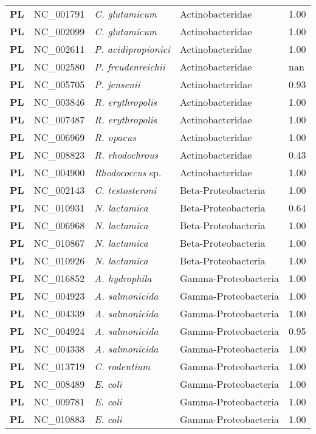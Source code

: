 \begin{adjustwidth}{-3cm}{2cm}
{\begin{supertabular}{>{\bfseries}l|p{0.1\textwidth}p{0.14\textwidth}l|l}
PL & NC\_001791 & \textit{C. glutamicum} & Actinobacteridae & 1.00\\
PL & NC\_002099 & \textit{C. glutamicum} & Actinobacteridae & 1.00\\
PL & NC\_002611 & \textit{P. acidipropionici} & Actinobacteridae & 1.00\\
PL & NC\_002580 & \textit{P. freudenreichii} & Actinobacteridae & nan\\
PL & NC\_005705 & \textit{P. jensenii} & Actinobacteridae & 0.93\\
PL & NC\_003846 & \textit{R. erythropolis} & Actinobacteridae & 1.00\\
PL & NC\_007487 & \textit{R. erythropolis} & Actinobacteridae & 1.00\\
PL & NC\_006969 & \textit{R. opacus} & Actinobacteridae & 1.00\\
PL & NC\_008823 & \textit{R. rhodochrous} & Actinobacteridae & 0.43\\
PL & NC\_004900 & \textit{Rhodococcus} sp. & Actinobacteridae & 1.00\\
PL & NC\_002143 & \textit{C. testosteroni} & Beta-Proteobacteria & 1.00\\
PL & NC\_010931 & \textit{N. lactamica} & Beta-Proteobacteria & 0.64\\
PL & NC\_006968 & \textit{N. lactamica} & Beta-Proteobacteria & 1.00\\
PL & NC\_010867 & \textit{N. lactamica} & Beta-Proteobacteria & 1.00\\
PL & NC\_010926 & \textit{N. lactamica} & Beta-Proteobacteria & 1.00\\
PL & NC\_016852 & \textit{A. hydrophila} & Gamma-Proteobacteria & 1.00\\
PL & NC\_004923 & \textit{A. salmonicida} & Gamma-Proteobacteria & 1.00\\
PL & NC\_004339 & \textit{A. salmonicida} & Gamma-Proteobacteria & 1.00\\
PL & NC\_004924 & \textit{A. salmonicida} & Gamma-Proteobacteria & 0.95\\
PL & NC\_004338 & \textit{A. salmonicida} & Gamma-Proteobacteria & 1.00\\
PL & NC\_013719 & \textit{C. rodentium} & Gamma-Proteobacteria & 1.00\\
PL & NC\_008489 & \textit{E. coli} & Gamma-Proteobacteria & 1.00\\
PL & NC\_009781 & \textit{E. coli} & Gamma-Proteobacteria & 1.00\\
PL & NC\_010883 & \textit{E. coli} & Gamma-Proteobacteria & 1.00\\

\end{supertabular}}
\end{adjustwidth}
